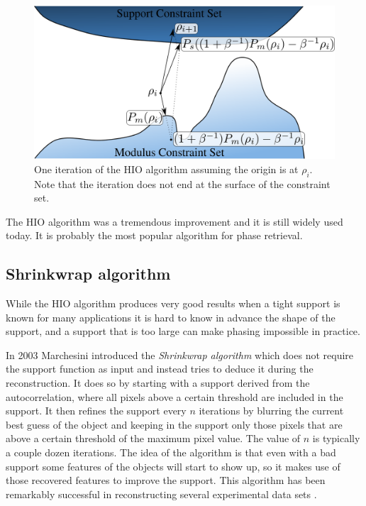 \begin{figure}[h]
\centering
  \includegraphics[width=0.9 \columnwidth]{Image_Reconstruction/hio_iteration.png}
  \caption{One iteration of the HIO algorithm assuming the origin is at
    $\rho_i$. Note that the iteration does not end at the surface of the
    constraint set.}
  \label{Fig:HIO_Iteration}
\end{figure}

The HIO algorithm was a tremendous improvement and it is still widely used
today. It is probably the most popular algorithm for phase retrieval. 

\subsection{Shrinkwrap algorithm}

While the HIO algorithm produces very good results when a tight support is known
for many applications it is hard to know in advance the shape of the support,
and a support that is too large can make phasing impossible in practice. 

In 2003 Marchesini \cite{Marchesini2003Xray} introduced the {\em Shrinkwrap
  algorithm} which does not require the support function as input and instead
tries to deduce it during the reconstruction. It does so by starting with a
support derived from the autocorrelation, where all pixels above a certain
threshold are included in the support. It then refines the support every $n$
iterations by blurring the current best guess of the object and keeping in the
support only those pixels that are above a certain threshold of the maximum pixel
value. The value of $n$ is typically a couple dozen iterations. The idea of the
algorithm is that even with a bad support some features of the objects will
start to show up, so it makes use of those recovered features to improve the
support. This algorithm has been remarkably successful in reconstructing several
experimental data sets
\cite{Chapman2006Highresolution,Barty2008Ultrafast,Barty2008Threedimensional}.

